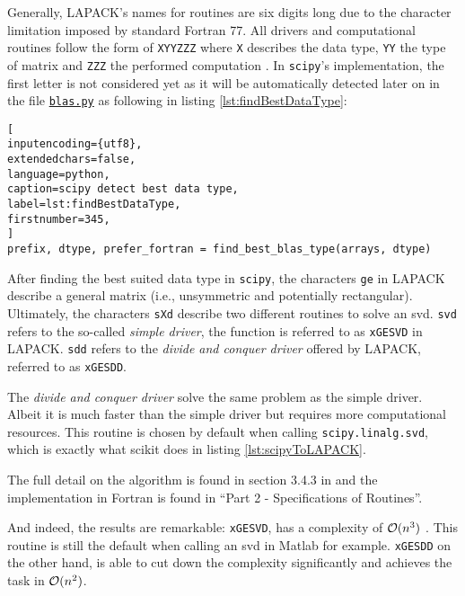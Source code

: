 Generally, LAPACK's names for routines are six digits long due to the character limitation imposed by standard Fortran 77.
All drivers and computational routines follow the form of \texttt{XYYZZZ} where \texttt{X} describes the data type, \texttt{YY} the type of matrix and \texttt{ZZZ} the performed computation \cite{anderson1999lapack}.
In \texttt{scipy}'s implementation, the first letter is not considered yet as it will be automatically detected later on in the file \href{\scipyvIxVIIxII{blas}}{\texttt{blas.py}} as following in listing \ref{lst:findBestDataType}:

\begin{lstlisting}[
inputencoding={utf8}, 
extendedchars=false, 
language=python, 
caption=scipy detect best data type, 
label=lst:findBestDataType,
firstnumber=345,
]
prefix, dtype, prefer_fortran = find_best_blas_type(arrays, dtype)
\end{lstlisting}

After finding the best suited data type in \texttt{scipy}, the characters \texttt{ge} in LAPACK describe a general matrix (i.e., unsymmetric and potentially rectangular).
Ultimately, the characters \texttt{sXd} describe two different routines to solve an \gls{svd}.
\texttt{svd} refers to the so-called \emph{simple driver}, the function is referred to as \texttt{xGESVD} in LAPACK.
\texttt{sdd} refers to the \emph{divide and conquer driver} offered by LAPACK, referred to as \texttt{xGESDD}.
\medskip

The \emph{divide and conquer driver} solve the same problem as the simple driver.
Albeit it is much faster than the simple driver but requires more computational resources.
This routine is chosen by default when calling \texttt{scipy.linalg.svd}, which is exactly what \gls{scikit} does in listing \ref{lst:scipyToLAPACK}.

The full detail on the algorithm is found in section 3.4.3 in  \cite{anderson1999lapack} and the implementation in Fortran is found in ``Part 2 - Specifications of Routines''.
\bigskip

And indeed, the results are remarkable: \texttt{xGESVD}, has a complexity of $\mathcal{O}(n^3)$ \cite{wright2001large}.
This routine is still the default when calling an \gls{svd} in Matlab for example.
\texttt{xGESDD} on the other hand, is able to cut down the complexity significantly and achieves the task in $\mathcal{O}(n^2)$\cite{anderson1999lapack}.


